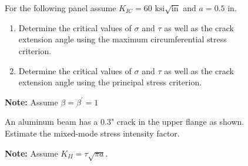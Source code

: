 \documentclass[12pt, oneside]{article}
\begin{document}
\begin{enumerate}
\begin{figure}[H]
	\item For the following panel assume $K_{IC} = 60 \text{ ksi}\sqrt{\text{in}}$ and $a = 0.5 \text{ in}$.
	\begin{enumerate}
		\item Determine the critical values of $\sigma$ and $\tau$ as well as the crack extension angle using the maximum circumferential stress criterion.
		\item Determine the critical values of $\sigma$ and $\tau$ as well as the crack extension angle using the principal stress criterion.
	\end{enumerate}
	\textbf{Note:} Assume $\beta = \beta^\prime = 1$
	
	\centering
\end{figure}

\begin{figure}[H]
	\item An aluminum beam has a 0.3" crack in the upper flange as shown. 
	Estimate the mixed-mode stress intensity factor.
	
	\textbf{Note:} Assume $K_{II} = \tau \sqrt{\pi a}$.
	

\end{figure}
\end{enumerate}
\end{document}
